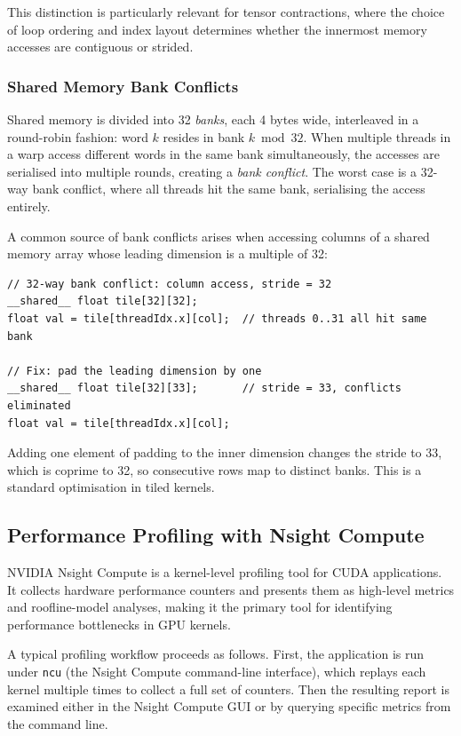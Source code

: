 This distinction is particularly relevant for tensor contractions, where the choice of loop ordering and index layout determines whether the innermost memory accesses are contiguous or strided.

\subsubsection{Shared Memory Bank Conflicts}

Shared memory is divided into 32 \emph{banks}, each 4 bytes wide, interleaved in a round-robin fashion: word $k$ resides in bank $k \bmod 32$. When multiple threads in a warp access different words in the same bank simultaneously, the accesses are serialised into multiple rounds, creating a \emph{bank conflict}. The worst case is a 32-way bank conflict, where all threads hit the same bank, serialising the access entirely.

A common source of bank conflicts arises when accessing columns of a shared memory array whose leading dimension is a multiple of 32:

\begin{lstlisting}[language=CUDA, caption={Bank conflict when accessing a column of a 32-wide shared array, and the padding fix.}, label={lst:bank-conflict}]
// 32-way bank conflict: column access, stride = 32
__shared__ float tile[32][32];
float val = tile[threadIdx.x][col];  // threads 0..31 all hit same bank

// Fix: pad the leading dimension by one
__shared__ float tile[32][33];       // stride = 33, conflicts eliminated
float val = tile[threadIdx.x][col];
\end{lstlisting}

Adding one element of padding to the inner dimension changes the stride to 33, which is coprime to 32, so consecutive rows map to distinct banks. This is a standard optimisation in tiled kernels.

\subsection{Performance Profiling with Nsight Compute}\label{sec:nsight}

NVIDIA Nsight Compute is a kernel-level profiling tool for CUDA applications. It collects hardware performance counters and presents them as high-level metrics and roofline-model analyses, making it the primary tool for identifying performance bottlenecks in GPU kernels.

A typical profiling workflow proceeds as follows. First, the application is run under \texttt{ncu} (the Nsight Compute command-line interface), which replays each kernel multiple times to collect a full set of counters. Then the resulting report is examined either in the Nsight Compute GUI or by querying specific metrics from the command line.

